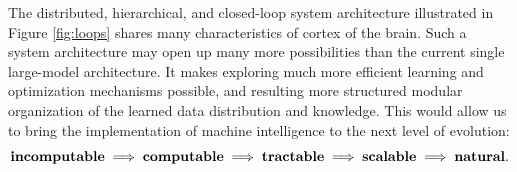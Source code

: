 \documentclass[../../book-main.tex]{subfiles}
\begin{document}
The distributed, hierarchical, and closed-loop system architecture illustrated in Figure \ref{fig:loops} shares many characteristics of cortex of the brain. Such a system architecture may open up many more possibilities than the current single large-model architecture. It makes exploring much more efficient learning and optimization mechanisms possible, and resulting more structured modular organization of the learned data distribution and knowledge. This would allow us to bring the implementation of machine intelligence to the next level of evolution: 
\begin{equation}
   \mbox{\textbf{incomputable}} \;
   \Longrightarrow \; \mbox{\textbf{computable}} \;
   \Longrightarrow \; \mbox{\textbf{tractable}} \; \Longrightarrow \; 
   \mbox{\textbf{scalable}} \; \Longrightarrow \; 
   \mbox{\textbf{natural}}.
\end{equation}
\end{document}
